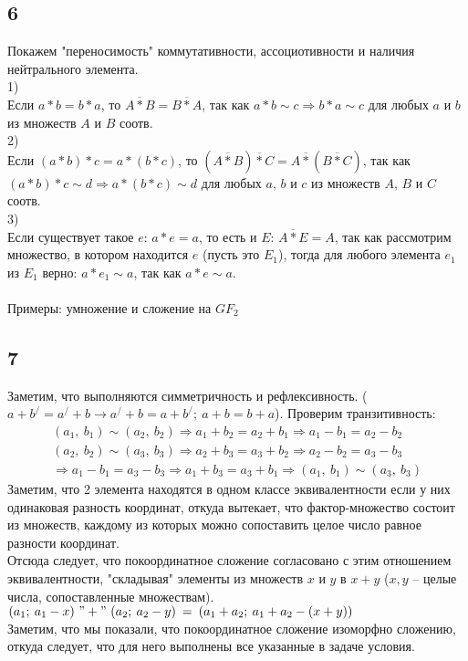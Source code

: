 		\subsection{6}
		Покажем "переносимость" коммутативности, ассоциотивности и наличия нейтрального элемента.\\	
		1)\\
		Если $a * b = b * a$, то $A\overline{ * }B = B\overline{ * }A$, так как $a * b \sim c  \Rightarrow b * a \sim c$  для любых $a$ и $b$ из множеств $A$ и $B$ соотв.\\
		2)\\
		Если $(a * b) * c = a * (b * c)$, то $(A\overline{ * }B)\overline{ * }C = A\overline{ * }(B\overline{ * }C)$, так как $(a * b) * c \sim d  \Rightarrow a * (b * c) \sim d$  для любых $a$, $b$ и $c$ из множеств $A$, $B$ и $C$ соотв.\\
		3)\\
		Если существует такое $e$: $a * e = a$, то есть и $E$: $A\overline{ * }E = A$, так как рассмотрим множество, в котором находится $e$ (пусть это $E_1$), тогда для любого элемента $e_1$ из $E_1$ верно: $a * e_1 \sim a$, так как $a * e \sim a$.\\
		\\
		Примеры: умножение и сложение на $GF_2$
%		
		\subsection{7}
		Заметим, что выполняются симметричность и рефлексивность. ($a + b^{/} = a^{/} + b \to a^{/} + b = a + b^{/};\ a + b = b + a$). Проверим транзитивность:
		\begin{gather*}
		(a_1, \: b_1) \sim (a_2, \: b_2) \Rightarrow a_1 + b_2 = a_2 + b_1 \Rightarrow a_1 - b_1 = a_2 - b_2 \\
		(a_2, \: b_2) \sim (a_3, \: b_3) \Rightarrow a_2 + b_3 = a_3 + b_2 \Rightarrow a_2 - b_2 = a_3 - b_3 \\
		\Rightarrow a_1 - b_1 =  a_3 - b_3 \Rightarrow a_1 + b_3 = a_3 + b_1 \Rightarrow (a_1, \: b_1) \sim (a_3, \: b_3)
		\end{gather*}
		Заметим, что 2 элемента находятся в одном классе эквивалентности если у них одинаковая разность координат, откуда вытекает, что фактор-множество состоит из множеств, каждому из которых можно сопоставить целое число равное разности координат.\\
		Отсюда следует, что покоординатное сложение согласовано с этим отношением эквивалентности, "складывая" элементы из множеств $x$ и $y$ в $x+y$ ($x,y$ -- целые числа, сопоставленные множествам). $(a_1; \: a_1 - x) \ "+" \ (a_2; \: a_2 - y) \: = \: (a_1 + a_2; \: a_1 + a_2 - (x + y))$\\
		Заметим, что мы показали, что покоординатное сложение изоморфно сложению, откуда следует, что для него выполнены все указанные в задаче условия.
		
